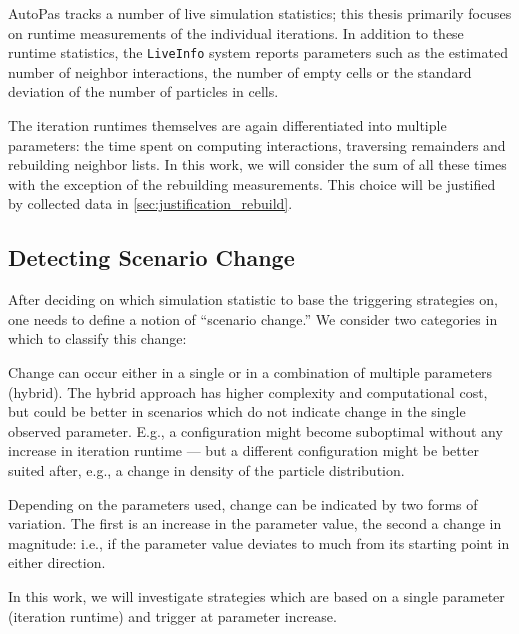 AutoPas tracks a number of live simulation statistics; this thesis primarily focuses on runtime measurements of the individual iterations.
In addition to these runtime statistics, the \texttt{LiveInfo} system reports parameters such as the estimated number of neighbor interactions, the number of empty cells or the standard deviation of the number of particles in cells. \cite{Newcome2025}

The iteration runtimes themselves are again differentiated into multiple parameters: the time spent on computing interactions, traversing remainders and rebuilding neighbor lists.
In this work, we will consider the sum of all these times with the exception of the rebuilding measurements. This choice will be justified by collected data in \autoref{sec:justification_rebuild}.

\subsection{Detecting Scenario Change}
\label{sec:change_detection}
After deciding on which simulation statistic to base the triggering strategies on, one needs to define a notion of \enquote{scenario change.} We consider two categories in which to classify this change:

\begin{description}[leftmargin=!,labelwidth=\widthof{\textbf{Type of variation }}]
	\item[\textbf{Parameter Space}] Change can occur either in a single or in a combination of multiple parameters (hybrid). The hybrid approach has higher complexity and computational cost, but could be better in scenarios which do not indicate change in the single observed parameter. E.g., a configuration might become suboptimal without any increase in iteration runtime --- but a different configuration might be better suited after, e.g., a change in density of the particle distribution.
	\item[\textbf{Type of Variation}] Depending on the parameters used, change can be indicated by two forms of variation. The first is an increase in the parameter value, the second a change in magnitude: i.e., if the parameter value deviates to much from its starting point in either direction.
\end{description}

In this work, we will investigate strategies which are based on a single parameter (iteration runtime) and trigger at parameter increase.


